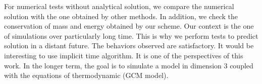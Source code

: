 \documentclass[10pt,a4paper]{article}
\begin{document}
For numerical tests without analytical solution, we compare the numerical solution
with the one  obtained by other methods. In addition, we check the conservation of
mass and energy obtained by our scheme.
Our context is the one of simulations over particularly long time. This is  why
we perform tests to predict solution in a distant future. The behaviors observed
are satisfactory. It would be interesting to use implicit time algorithm. It is one
of the perspectives of this work.
In the longer term, the goal is to simulate a model in dimension 3 coupled with the 
 equations of thermodynamic (GCM model).

	
	
	
	
\end{document}
